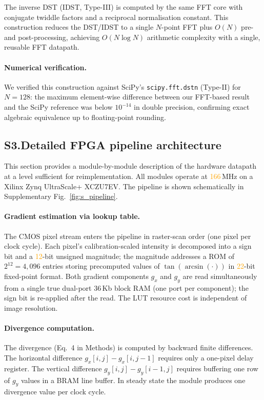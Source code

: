 \documentclass[10pt,a4paper]{article}
\newcommand{\placeholder}[1]{\textcolor{orange}{#1}}
\newcommand{\clockMHz}{\placeholder{166}}
\begin{document}
The inverse DST (IDST, Type-III) is computed by the same FFT core with conjugate twiddle factors and a reciprocal normalisation constant. This construction reduces the DST/IDST to a single $N$-point FFT plus $O(N)$ pre- and post-processing, achieving $O(N \log N)$ arithmetic complexity with a single, reusable FFT datapath.

\paragraph{Numerical verification.}
We verified this construction against SciPy's \texttt{scipy.fft.dstn} (Type-II) for $N = 128$: the maximum element-wise difference between our FFT-based result and the SciPy reference was below $10^{-14}$ in double precision, confirming exact algebraic equivalence up to floating-point rounding.


\subsection*{S3.\quad Detailed FPGA pipeline architecture}

This section provides a module-by-module description of the hardware datapath at a level sufficient for reimplementation. All modules operate at \clockMHz\,MHz on a Xilinx Zynq UltraScale+ XCZU7EV. The pipeline is shown schematically in Supplementary Fig.~\ref{fig:s_pipeline}.

\paragraph{Gradient estimation via lookup table.}
The CMOS pixel stream enters the pipeline in raster-scan order (one pixel per clock cycle). Each pixel's calibration-scaled intensity is decomposed into a sign bit and a \placeholder{12}-bit unsigned magnitude; the magnitude addresses a ROM of $2^{12} = 4{,}096$ entries storing precomputed values of $\tan(\arcsin(\cdot))$ in \placeholder{22}-bit fixed-point format. Both gradient components $g_x$ and $g_y$ are read simultaneously from a single true dual-port 36\,Kb block RAM (one port per component); the sign bit is re-applied after the read. The LUT resource cost is independent of image resolution.

\paragraph{Divergence computation.}
The divergence (Eq.~4 in Methods) is computed by backward finite differences. The horizontal difference $g_x[i,j] - g_x[i,j{-}1]$ requires only a one-pixel delay register. The vertical difference $g_y[i,j] - g_y[i{-}1,j]$ requires buffering one row of $g_y$ values in a BRAM line buffer. In steady state the module produces one divergence value per clock cycle.
\end{document}
